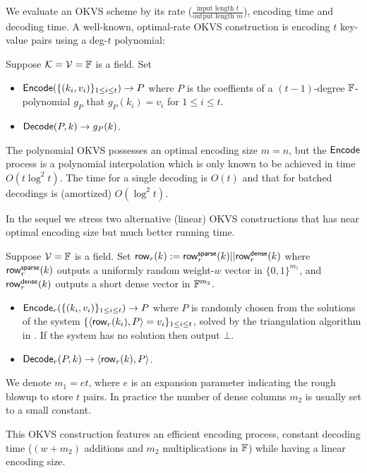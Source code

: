 We evaluate an OKVS scheme by its rate ($\frac{\text{input length }t}{\text{output length }m}$), encoding time and decoding time. A well-known, optimal-rate OKVS construction is encoding $t$ key-value pairs using a deg-$t$ polynomial: 
\begin{construction}[Polynomial]\label{con:OKVS_polynomial}
  Suppose $\mathcal{K} = \mathcal{V}=\mathbb{F}$ is a field. Set 
  \begin{itemize}
    \item ${\sf Encode}(\{(k_i,v_i)\}_{1\le i\le t}) \rightarrow P$ where $P$ is the coeffients of a $(t-1)$-degree $\mathbb{F}$-polynomial $g_P$ that $g_P(k_i) = v_i$ for $1\le i\le t$. 
    \item ${\sf Decode}(P,k)\rightarrow g_P(k)$. 
  \end{itemize}
\end{construction}
The polynomial OKVS possesses an optimal encoding size $m=n$, but the ${\sf Encode}$ process is a polynomial interpolation which is only known to be achieved in time $O(t\log^2t)$. The time for a single decoding is $O(t)$ and that for batched decodings is (amortized) $O(\log^2 t)$. 

In the sequel we stress two alternative (linear) OKVS constructions that has near optimal encoding size but much better running time. 

\begin{construction}\label{con:OKVS_sparse_matrix}
  Suppose $\mathcal{V}=\mathbb{F}$ is a field. Set ${\sf row}_r(k):={\sf row}_r^{\sf sparse}(k)||{\sf row}_r^{\sf dense}(k)$ where ${\sf row}_r^{\sf sparse}(k)$ outputs a uniformly random weight-$w$ vector in $\{0,1\}^{m_1}$, and ${\sf row}_r^{\sf dense}(k)$ outputs a short dense vector in $\mathbb{F}^{m_2}$. 
  \begin{itemize}
    \item ${\sf Encode}_r(\{(k_i,v_i)\}_{1\le i\le t}) \rightarrow P$ where $P$ is randomly chosen from the solutions of the system $\{\langle {\sf row}_r(k_i), P \rangle = v_i\}_{1\le i\le t}$, solved by the triangulation algorithm in \cite{cryptoeprint:2022/320}. If the system has no solution then output $\bot$. 
    \item ${\sf Decode}_r(P,k)\rightarrow \langle {\sf row}_r(k), P \rangle$. 
  \end{itemize}
  We denote $m_1=et$, where $e$ is an expansion parameter indicating the rough blowup to store $t$ pairs. In practice the number of dense columns $m_2$ is usually set to a small constant. 
\end{construction}
This OKVS construction features an efficient encoding process, constant decoding time ($(w+m_2)$ additions and $m_2$ multiplications in $\mathbb{F}$) while having a linear encoding size. 

